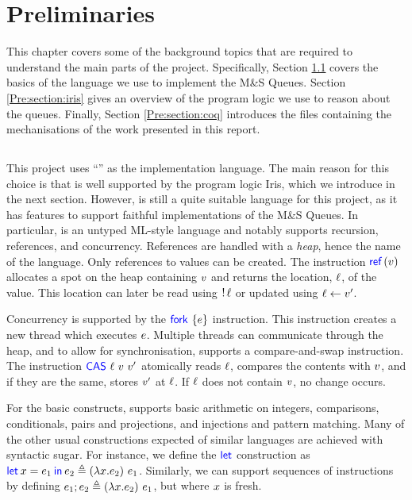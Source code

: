 \documentclass[a4paper, 10pt]{report}
\theoremstyle{definition}
\newcommand{\msq}{M\&S Queue}
\begin{document}

\chapter{Preliminaries}
\label{ch:pre}

This chapter covers some of the background topics that are required to understand the main parts of the project. Specifically, Section \ref{Pre:section:heaplang} covers the basics of the language we use to implement the \msq{}s. Section \ref{Pre:section:iris} gives an overview of the program logic we use to reason about the queues. Finally, Section \ref{Pre:section:coq} introduces the files containing the mechanisations of the work presented in this report.

\section{\heaplang}
\label{Pre:section:heaplang}

This project uses ``\heaplang'' as the implementation language. The main reason for this choice is that \heaplang is well supported by the program logic Iris, which we introduce in the next section. However, \heaplang is still a quite suitable language for this project, as it has features to support faithful implementations of the \msq{}s. In particular, \heaplang is an untyped ML-style language and notably supports recursion, references, and concurrency. References are handled with a \textit{heap}, hence the name of the language. Only references to values can be created. The instruction $\Ref(\val)$ allocates a spot on the heap containing $v$ and returns the location, $\ell$, of the value. This location can later be read using $\mathop{!} \ell$ or updated using $\ell \leftarrow v'$.

Concurrency is supported by the $\Fork{\expr}$ instruction. This instruction creates a new thread which executes $e$. Multiple threads can communicate through the heap, and to allow for synchronisation, \heaplang supports a compare-and-swap instruction. The instruction $\textsf{\color{blue} CAS} \ \ell \ v \ v'$ atomically reads $\ell$, compares the contents with $v$, and if they are the same, stores $v'$ at $\ell$. If $\ell$ does not contain $v$, no change occurs.

For the basic constructs, \heaplang supports basic arithmetic on integers, comparisons, conditionals, pairs and projections, and injections and pattern matching. Many of the other usual constructions expected of similar languages are achieved with syntactic sugar. For instance, we define the $\textsf{\color{blue} let}$ construction as $\Let \var = \expr_1 in \expr_2 \eqdef (\lambda{} \var . \expr_2) ~ \expr_1$. Similarly, we can support sequences of instructions by defining $e_1 ; e_2 \triangleq (\lambda{} x . e_2) ~ e_1$, but where $x$ is fresh.
\end{document}
